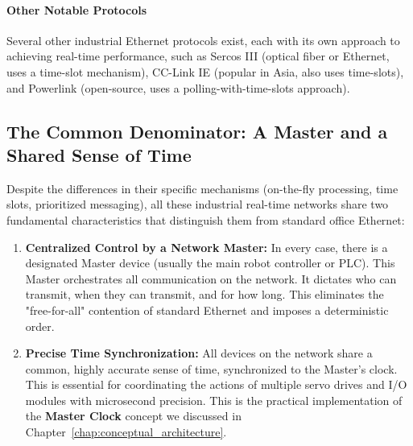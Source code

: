 \paragraph{Other Notable Protocols}
Several other industrial Ethernet protocols exist, each with its own approach to achieving real-time performance, such as Sercos III (optical fiber or Ethernet, uses a time-slot mechanism), CC-Link IE (popular in Asia, also uses time-slots), and Powerlink (open-source, uses a polling-with-time-slots approach).

\subsection{The Common Denominator: A Master and a Shared Sense of Time}
\label{subsec:rt_network_common_principles}

Despite the differences in their specific mechanisms (on-the-fly processing, time slots, prioritized messaging), all these industrial real-time networks share two fundamental characteristics that distinguish them from standard office Ethernet:
\begin{enumerate}
    \item \textbf{Centralized Control by a Network Master:} In every case, there is a designated Master device (usually the main robot controller or PLC). This Master orchestrates all communication on the network. It dictates who can transmit, when they can transmit, and for how long. This eliminates the "free-for-all" contention of standard Ethernet and imposes a deterministic order.
    \item \textbf{Precise Time Synchronization:} All devices on the network share a common, highly accurate sense of time, synchronized to the Master's clock. This is essential for coordinating the actions of multiple servo drives and I/O modules with microsecond precision. This is the practical implementation of the \textbf{Master Clock} concept we discussed in Chapter~\ref{chap:conceptual_architecture}.
\end{enumerate}

